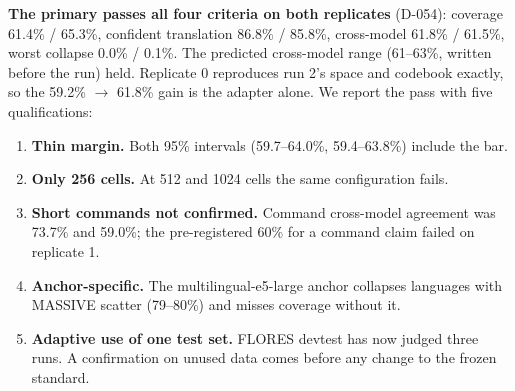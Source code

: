 \documentclass[
  10pt,
]{article}
\providecommand{\tightlist}{%
  \setlength{\itemsep}{0pt}\setlength{\parskip}{0pt}}
\begin{document}
\textbf{The primary passes all four criteria on both replicates}
(D-054): coverage 61.4\% / 65.3\%, confident translation 86.8\% /
85.8\%, cross-model 61.8\% / 61.5\%, worst collapse 0.0\% / 0.1\%. The
predicted cross-model range (61--63\%, written before the run) held.
Replicate 0 reproduces run 2's space and codebook exactly, so the 59.2\%
$\rightarrow$ 61.8\% gain is the adapter alone. We report the pass with five
qualifications:

\begin{enumerate}
\def\labelenumi{\arabic{enumi}.}
\tightlist
\item
  \textbf{Thin margin.} Both 95\% intervals (59.7--64.0\%, 59.4--63.8\%)
  include the bar.
\item
  \textbf{Only 256 cells.} At 512 and 1024 cells the same configuration
  fails.
\item
  \textbf{Short commands not confirmed.} Command cross-model agreement
  was 73.7\% and 59.0\%; the pre-registered 60\% for a command claim
  failed on replicate 1.
\item
  \textbf{Anchor-specific.} The multilingual-e5-large anchor collapses
  languages with MASSIVE scatter (79--80\%) and misses coverage without
  it.
\item
  \textbf{Adaptive use of one test set.} FLORES devtest has now judged
  three runs. A confirmation on unused data comes before any change to
  the frozen standard.
\end{enumerate}
\end{document}
